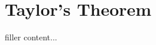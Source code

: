 \documentclass[../../templates/section]{subfiles}
\begin{document}
\section{Taylor's Theorem}\label{sec:taylors-theorem}

filler content...
\end{document}
